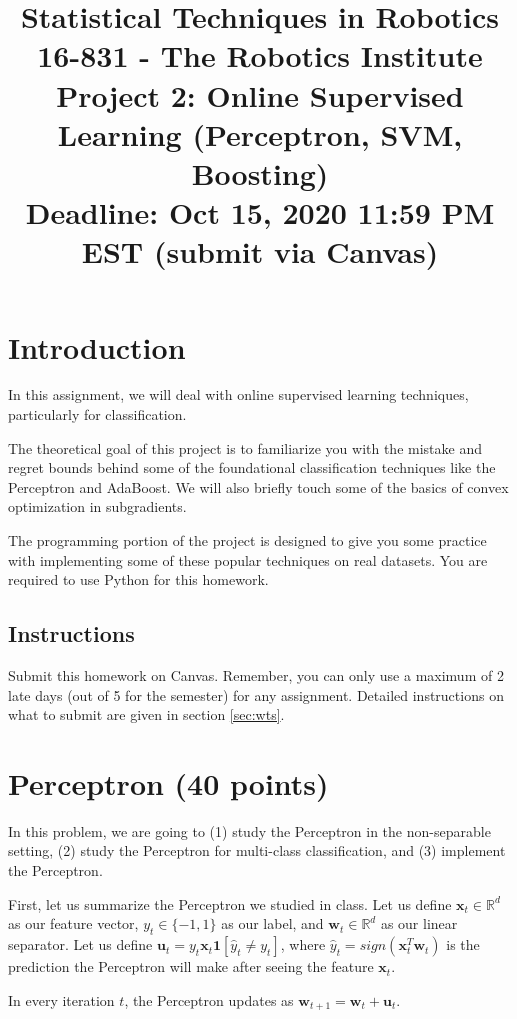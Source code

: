 \documentclass{article}
\title
{ 
{\small Statistical Techniques in Robotics 16-831 - The Robotics Institute} \\
Project 2: Online Supervised Learning (Perceptron, SVM, Boosting) \\
{\large Deadline: Oct 15, 2020 11:59 PM EST (submit via Canvas)}}
\date{}
\begin{document}
\maketitle

\section{Introduction}

In this assignment, we will deal with online supervised learning techniques, particularly for classification.

The theoretical goal of this project is to familiarize you with the mistake and regret bounds behind some of the foundational classification techniques like the Perceptron and AdaBoost. We will also briefly touch some of the basics of convex optimization in subgradients. 

The programming portion of the project is designed to give you some practice with implementing some of these popular techniques on real datasets. You are required to use Python for this homework. 

\subsection{Instructions}
Submit this homework on Canvas. Remember, you can only use a maximum of 2 late days (out of 5 for the semester) for any assignment.
Detailed instructions on what to submit are given in section \ref{sec:wts}.

\section{Perceptron (40 points)}

In this problem, we are going to (1) study the Perceptron in the non-separable setting, (2) study the Perceptron for multi-class classification, and (3) implement the Perceptron.

First, let us summarize the Perceptron we studied in class.
Let us define $\mathbf{x}_t\in\mathbb{R}^d$ as our feature vector, $y_t \in \{-1,1\}$ as our label, and $\mathbf{w}_t\in\mathbb{R}^d$ as our linear separator.
Let us define $\mathbf{u}_t = y_t \mathbf{x}_t \mathbf{1}[\hat{y}_t \neq y_t]$, where $\hat{y}_t = sign(\mathbf{x}_t^T\mathbf{w}_t)$ is the prediction the Perceptron will make after seeing the feature $\mathbf{x}_t$. 

In every iteration $t$, the Perceptron updates as $\mathbf{w}_{t+1} = \mathbf{w}_t + \mathbf{u}_t$.
\end{document}
